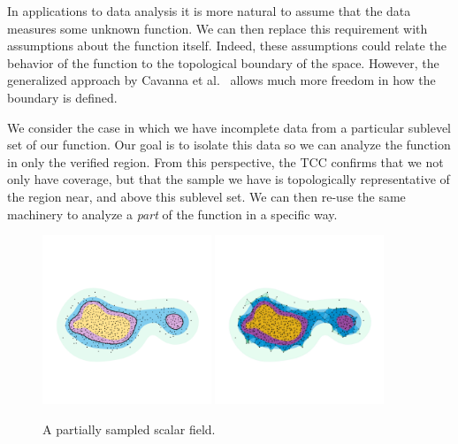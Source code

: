 In applications to data analysis it is more natural to assume that the data measures some unknown function.
We can then replace this requirement with assumptions about the function itself.
Indeed, these assumptions could relate the behavior of the function to the topological boundary of the space.
However, the generalized approach by Cavanna et al.~\cite{cavanna2017when} allows much more freedom in how the boundary is defined.

We consider the case in which we have incomplete data from a particular sublevel set of our function.
Our goal is to isolate this data so we can analyze the function in only the verified region.
From this perspective, the TCC confirms that we not only have coverage, but that the sample we have is topologically representative of the region near, and above this sublevel set.
We can then re-use the same machinery to analyze a \emph{part} of the function in a specific way.

\begin{figure}[htbp]
  \centering
  \includegraphics[trim=0 500 0 500, clip, width=0.45\textwidth]{figures/samples/samples_comp.pdf}
  \includegraphics[trim=0 500 0 500, clip, width=0.45\textwidth]{figures/samples/scalar1_comp.pdf}
  \caption{A partially sampled scalar field.}\label{fig:main}
\end{figure}
